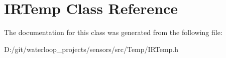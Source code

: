 \hypertarget{class_i_r_temp}{}\section{I\+R\+Temp Class Reference}
\label{class_i_r_temp}


The documentation for this class was generated from the following file\+:\begin{DoxyCompactItemize}
\item 
D\+:/git/waterloop\+\_\+projects/sensors/src/\+Temp/I\+R\+Temp.\+h\end{DoxyCompactItemize}
